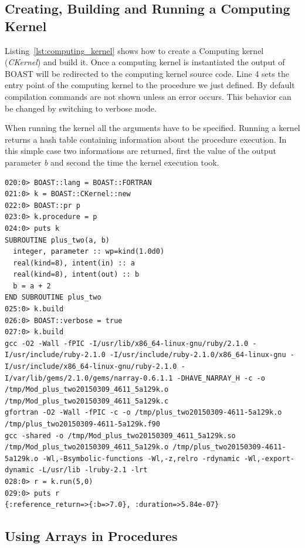 \documentclass[11pt, a4paper, twoside]{montblanc}
\begin{document}
\subsection*{Creating, Building and Running a Computing Kernel}

Listing~\ref{lst:computing_kernel} shows how to create a Computing kernel
(\textit{CKernel}) and build it. Once a computing kernel is instantiated the
output of BOAST will be redirected to the computing kernel source code. Line 4
sets the entry point of the computing kernel to the procedure we just defined.
By default compilation commands are not shown unless an error occurs. This
behavior can be changed by switching to verbose mode.

When running the kernel all the arguments have to be specified. Running a
kernel returns a hash table containing information about the procedure
execution. In this simple case two informations are returned, first the value
of the output parameter \textit{b} and second the time the kernel execution
took.

\begin{lstlisting}
020:0> BOAST::lang = BOAST::FORTRAN
021:0> k = BOAST::CKernel::new
022:0> BOAST::pr p
023:0> k.procedure = p
024:0> puts k
SUBROUTINE plus_two(a, b)
  integer, parameter :: wp=kind(1.0d0)
  real(kind=8), intent(in) :: a
  real(kind=8), intent(out) :: b
  b = a + 2
END SUBROUTINE plus_two
025:0> k.build
026:0> BOAST::verbose = true
027:0> k.build
gcc -O2 -Wall -fPIC -I/usr/lib/x86_64-linux-gnu/ruby/2.1.0 -I/usr/include/ruby-2.1.0 -I/usr/include/ruby-2.1.0/x86_64-linux-gnu -I/usr/include/x86_64-linux-gnu/ruby-2.1.0 -I/var/lib/gems/2.1.0/gems/narray-0.6.1.1 -DHAVE_NARRAY_H -c -o /tmp/Mod_plus_two20150309_4611_5a129k.o /tmp/Mod_plus_two20150309_4611_5a129k.c
gfortran -O2 -Wall -fPIC -c -o /tmp/plus_two20150309-4611-5a129k.o /tmp/plus_two20150309-4611-5a129k.f90
gcc -shared -o /tmp/Mod_plus_two20150309_4611_5a129k.so /tmp/Mod_plus_two20150309_4611_5a129k.o /tmp/plus_two20150309-4611-5a129k.o -Wl,-Bsymbolic-functions -Wl,-z,relro -rdynamic -Wl,-export-dynamic -L/usr/lib -lruby-2.1 -lrt
028:0> r = k.run(5,0)
029:0> puts r
{:reference_return=>{:b=>7.0}, :duration=>5.84e-07}
\end{lstlisting}

\subsection*{Using Arrays in Procedures}
\end{document}
